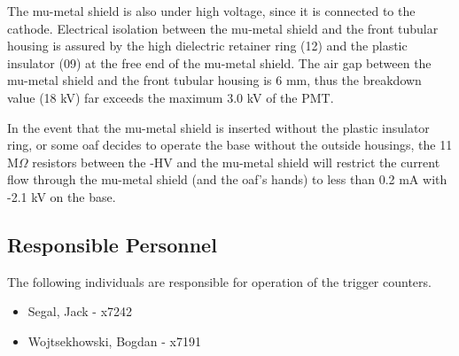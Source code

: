 The mu-metal shield is also under high voltage, since it is connected to the 
cathode. Electrical isolation between the mu-metal shield and the front 
tubular housing is assured by the high dielectric retainer ring (12) and the 
plastic insulator (09) at the free end of the mu-metal shield. The air gap 
between the mu-metal shield and the front tubular housing is 6 mm, thus the 
breakdown value (18 kV) far exceeds the maximum 3.0 kV of the PMT.

In the event that the mu-metal shield is inserted without the plastic insulator 
ring, or some oaf decides to operate the base without the outside housings, the 
11 M$\Omega$ resistors between the -HV and the mu-metal shield will restrict the 
current flow through the mu-metal shield (and the oaf's hands) to less than 0.2 
mA with -2.1 kV on the base. 

\subsection{Responsible Personnel} 
The following individuals are responsible for operation of the trigger counters. 
\begin{itemize}
\item[~]Segal, Jack - x7242 
\item[~]Wojtsekhowski, Bogdan - x7191 
\end{itemize} 








%
%
%
